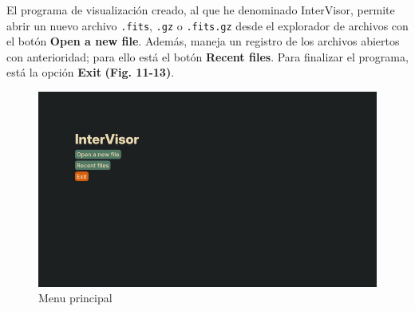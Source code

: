 \documentclass[10pt,twocolumn,a4paper]{opticajnl}
\begin{document}
El programa de visualización creado, al que he denominado InterVisor, permite abrir un nuevo archivo \verb|.fits|, \verb|.gz| o \verb|.fits.gz| desde el explorador de archivos con el botón \textbf{Open a new file}. Además, maneja un registro de los archivos abiertos con anterioridad; para ello está el botón \textbf{Recent files}. Para finalizar el programa, está la opción \textbf{Exit} \textbf{(Fig. 11-13)}.

\begin{figure}
    \centering
    \includegraphics[width=1\linewidth]{menuprincipal1.png}
    \caption{Menu principal}
    \label{fig:menuprincipal1}
\end{figure}
\end{document}
